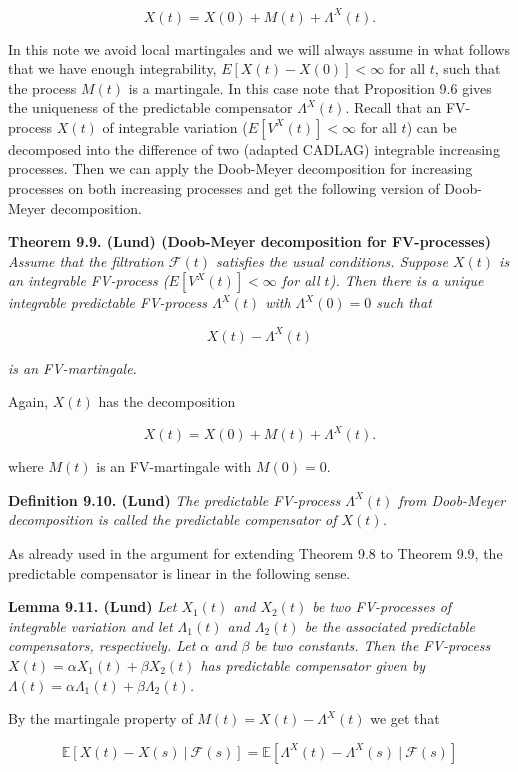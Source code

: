 \documentclass[a4paper,10pt,openany]{book}
\begin{document}
\[
X(t)=X(0)+M(t)+\Lambda^X(t).
\]

In this note we avoid local martingales and we will always assume in what follows that we have enough integrability, \(E[X(t)−X(0)] < \infty\) for all \(t\), such that the process \(M(t)\) is a martingale. In this case note that Proposition 9.6 gives the uniqueness of the predictable compensator \(\Lambda^X(t)\). Recall that an FV-process \(X(t)\) of integrable variation (\(E[V^X(t)] < \infty\) for all \(t\)) can be decomposed into the difference of two (adapted CADLAG) integrable increasing processes. Then we can apply the Doob-Meyer decomposition for increasing processes on both increasing processes and get the following version of Doob-Meyer decomposition.

\textbf{Theorem 9.9. (Lund) (Doob-Meyer decomposition for FV-processes)} \emph{Assume that the filtration \(\mathcal F(t)\) satisfies the usual conditions. Suppose \(X(t)\) is an integrable FV-process (\(E[V^X(t)] < \infty\) for all \(t\)). Then there is a unique integrable predictable FV-process \(\Lambda^X (t)\) with \(\Lambda^X (0) = 0\) such that}

\[
X(t)-\Lambda^X(t)
\]

\emph{is an FV-martingale.}

Again, \(X(t)\) has the decomposition

\[
X(t)=X(0)+M(t)+\Lambda^X(t).
\]

where \(M(t)\) is an FV-martingale with \(M(0) = 0\).

\textbf{Definition 9.10. (Lund)} \emph{The predictable FV-process \(\Lambda^X (t)\) from Doob-Meyer decomposition is called the predictable compensator of \(X(t)\).}

As already used in the argument for extending Theorem 9.8 to Theorem 9.9, the predictable compensator is linear in the following sense.

\textbf{Lemma 9.11. (Lund)} \emph{Let \(X_1(t)\) and \(X_2(t)\) be two FV-processes of integrable variation and let \(\Lambda_1(t)\) and \(\Lambda_2(t)\) be the associated predictable compensators, respectively. Let \(\alpha\) and \(\beta\) be two constants. Then the FV-process \(X(t) = \alpha X_1(t) + \beta X_2(t)\) has predictable compensator given by \(\Lambda(t) = \alpha\Lambda_1(t) + \beta\Lambda_2(t)\).}

By the martingale property of \(M(t) = X(t) − \Lambda^X(t)\) we get that

\[
\mathbb E[X(t)-X(s)\ \vert\ \mathcal F(s)]=\mathbb E[\Lambda^X(t)-\Lambda^X(s)\ \vert\ \mathcal F(s)]
\]
\end{document}
